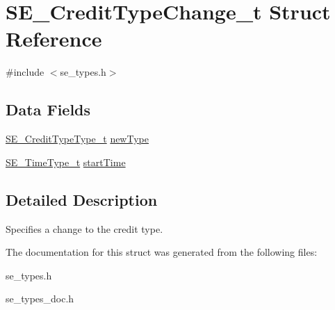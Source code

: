 \hypertarget{structSE__CreditTypeChange__t}{}\section{S\+E\+\_\+\+Credit\+Type\+Change\+\_\+t Struct Reference}
\label{structSE__CreditTypeChange__t}


{\ttfamily \#include $<$se\+\_\+types.\+h$>$}

\subsection*{Data Fields}
\begin{DoxyCompactItemize}
\item 
\hyperlink{group__CreditTypeType_ga5a63742e5c65087df17ed6ad8f420b5e}{S\+E\+\_\+\+Credit\+Type\+Type\+\_\+t} \hyperlink{group__CreditTypeChange_ga41afe9d77d6e3eeacda417610bf56ba8}{new\+Type}
\item 
\hyperlink{group__TimeType_ga6fba87a5b57829b4ff3f0e7638156682}{S\+E\+\_\+\+Time\+Type\+\_\+t} \hyperlink{group__CreditTypeChange_ga729481edafcc434e3a9cf600f627b423}{start\+Time}
\end{DoxyCompactItemize}


\subsection{Detailed Description}
Specifies a change to the credit type. 

The documentation for this struct was generated from the following files\+:\begin{DoxyCompactItemize}
\item 
se\+\_\+types.\+h\item 
se\+\_\+types\+\_\+doc.\+h\end{DoxyCompactItemize}
